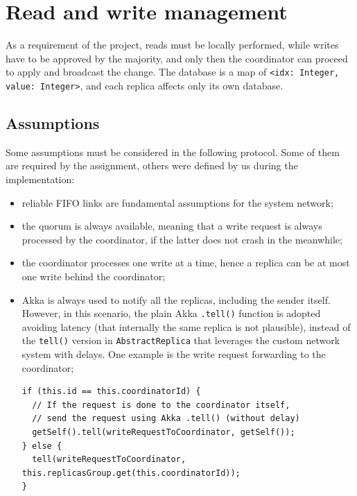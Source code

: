 \section{Read and write management}

As a requirement of the project, reads must be locally performed, while writes have to be approved by the majority, and only then the coordinator can proceed to apply and broadcast the change. The database is a map of \texttt{<idx: Integer, value: Integer>}, and each replica affects only its own database.

\subsection{Assumptions}

Some assumptions must be considered in the following protocol. Some of them are required by the assignment, others were defined by us during the implementation:

\begin{itemize}
\item reliable FIFO links are fundamental assumptions for the system network;

\item the quorum is always available, meaning that a write request is always processed by the coordinator, if the latter does not crash in the meanwhile;

\item the coordinator processes one write at a time, hence a replica can be at most one write behind the coordinator;

\item Akka is always used to notify all the replicas, including the sender itself. However, in this scenario, the plain Akka \texttt{.tell()} function is adopted avoiding latency (that internally the same replica is not plausible), instead of the \texttt{tell()} version in \texttt{AbstractReplica} that leverages the custom network system with delays. One example is the write request forwarding to the coordinator;

    \begin{lstlisting}
if (this.id == this.coordinatorId) {
  // If the request is done to the coordinator itself,
  // send the request using Akka .tell() (without delay)
  getSelf().tell(writeRequestToCoordinator, getSelf());
} else {
  tell(writeRequestToCoordinator, this.replicasGroup.get(this.coordinatorId));
}
    \end{lstlisting}

\end{itemize}

